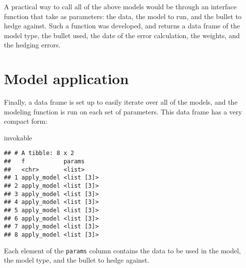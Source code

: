 \documentclass[openany]{book}
\newenvironment{Shaded}{\begin{snugshade}}{\end{snugshade}}
\newcommand{\DecValTok}[1]{\textcolor[rgb]{0.00,0.00,0.81}{#1}}
\newcommand{\NormalTok}[1]{#1}
\newcommand{\OperatorTok}[1]{\textcolor[rgb]{0.81,0.36,0.00}{\textbf{#1}}}
\theoremstyle{definition}
\theoremstyle{definition}
\theoremstyle{definition}
\theoremstyle{remark}
\begin{document}
A practical way to call all of the above models would be through an
interface function that take as parameters: the data, the model to run,
and the bullet to hedge against. Such a function was developed, and
returns a data frame of the model type, the bullet used, the date of the
error calculation, the weights, and the hedging errors.

\small

\normalsize

\small

\normalsize

\small

\normalsize

\small

\normalsize

\hypertarget{model-application}{%
\section{Model application}\label{model-application}}

\small

\normalsize

Finally, a data frame is set up to easily iterate over all of the
models, and the modeling function is run on each set of parameters. This
data frame has a very compact form:

\small

\begin{Shaded}
\begin{Highlighting}[]
\NormalTok{invokable}
\end{Highlighting}
\end{Shaded}

\begin{verbatim}
## # A tibble: 8 x 2
##   f           params    
##   <chr>       <list>    
## 1 apply_model <list [3]>
## 2 apply_model <list [3]>
## 3 apply_model <list [3]>
## 4 apply_model <list [3]>
## 5 apply_model <list [3]>
## 6 apply_model <list [3]>
## 7 apply_model <list [3]>
## 8 apply_model <list [3]>
\end{verbatim}

\normalsize

Each element of the \texttt{params} column contains the data to be used
in the model, the model type, and the bullet to hedge against.

\small

\begin{Shaded}
\end{Shaded}
\end{document}
